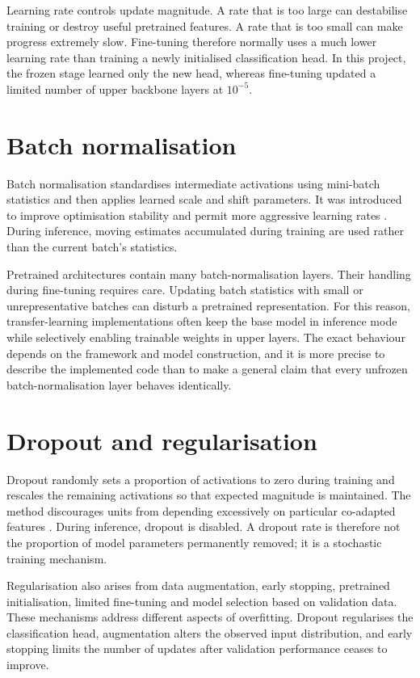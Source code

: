 Learning rate controls update magnitude. A rate that is too large can destabilise training or destroy useful pretrained features. A rate that is too small can make progress extremely slow. Fine-tuning therefore normally uses a much lower learning rate than training a newly initialised classification head. In this project, the frozen stage learned only the new head, whereas fine-tuning updated a limited number of upper backbone layers at $10^{-5}$.

\section{Batch normalisation}
Batch normalisation standardises intermediate activations using mini-batch statistics and then applies learned scale and shift parameters. It was introduced to improve optimisation stability and permit more aggressive learning rates \citep{ioffe2015batch}. During inference, moving estimates accumulated during training are used rather than the current batch's statistics.

Pretrained architectures contain many batch-normalisation layers. Their handling during fine-tuning requires care. Updating batch statistics with small or unrepresentative batches can disturb a pretrained representation. For this reason, transfer-learning implementations often keep the base model in inference mode while selectively enabling trainable weights in upper layers. The exact behaviour depends on the framework and model construction, and it is more precise to describe the implemented code than to make a general claim that every unfrozen batch-normalisation layer behaves identically.

\section{Dropout and regularisation}
Dropout randomly sets a proportion of activations to zero during training and rescales the remaining activations so that expected magnitude is maintained. The method discourages units from depending excessively on particular co-adapted features \citep{srivastava2014dropout}. During inference, dropout is disabled. A dropout rate is therefore not the proportion of model parameters permanently removed; it is a stochastic training mechanism.

Regularisation also arises from data augmentation, early stopping, pretrained initialisation, limited fine-tuning and model selection based on validation data. These mechanisms address different aspects of overfitting. Dropout regularises the classification head, augmentation alters the observed input distribution, and early stopping limits the number of updates after validation performance ceases to improve.

